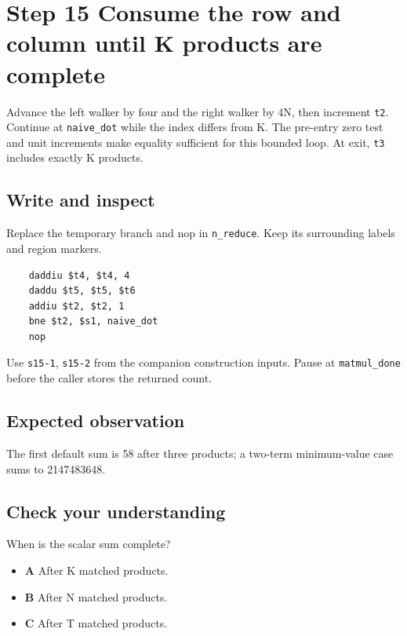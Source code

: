 \section{Step 15 Consume the row and column until K products are complete}\label{matmul-s15}

Advance the left walker by four and the right walker by 4N, then increment \texttt{t2}. Continue at \texttt{naive\_dot} while the index differs from K. The pre-entry zero test and unit increments make equality sufficient for this bounded loop. At exit, \texttt{t3} includes exactly K products.

\subsection{Write and inspect}
Replace the temporary branch and nop in \texttt{n\_reduce}. Keep its surrounding labels and region markers.

\begin{verbatim}
    daddiu $t4, $t4, 4
    daddu $t5, $t5, $t6
    addiu $t2, $t2, 1
    bne $t2, $s1, naive_dot
    nop
\end{verbatim}
Use \texttt{s15-1}, \texttt{s15-2} from the companion construction inputs. Pause at \texttt{matmul\_done} before the caller stores the returned count.

\subsection{Expected observation}
The first default sum is 58 after three products; a two-term minimum-value case sums to 2147483648.

\subsection{Check your understanding}
When is the scalar sum complete?

\begin{itemize}
  \item \textbf{A} After K matched products.
  \item \textbf{B} After N matched products.
  \item \textbf{C} After T matched products.
\end{itemize}
